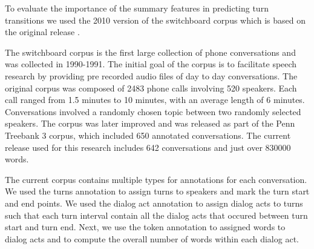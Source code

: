 To evaluate the importance of the summary features in predicting turn transitions we used the 2010 version of the switchboard corpus \cite{calhoun2010nxt} which is based on the original release \cite{225858}.

The switchboard corpus is the first large collection of phone conversations and was collected in 1990-1991. The initial goal of the corpus is to facilitate speech research by providing pre recorded audio files of day to day conversations. The original corpus was composed of 2483 phone calls involving 520 speakers. Each call ranged from 1.5 minutes to 10 minutes, with an average length of 6 minutes. Conversations involved a randomly chosen topic between two randomly selected speakers. The corpus was later improved and was released as part of the Penn Treebank 3 corpus, which included 650 annotated conversations. The current release used for this research includes 642 conversations and just over 830000 words.

The current corpus contains multiple types for annotations for each conversation. We used the turns annotation to assign turns to speakers and mark the turn start and end points. We used the dialog act annotation to assign dialog acts to turns such that each turn interval contain all the dialog acts that occured between turn start and turn end. Next, we use the token annotation to assigned words to dialog acts and to compute the overall number of words within each dialog act.
